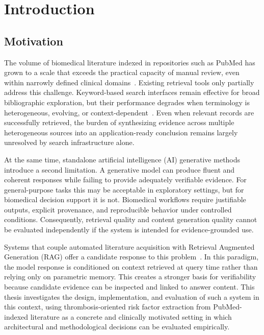 \chapter{Introduction}

\section{Motivation}

The volume of biomedical literature indexed in repositories such as PubMed has grown to a scale that exceeds the practical capacity of manual review, even within narrowly defined clinical domains~\cite{sayers2022eutilities}. Existing retrieval tools only partially address this challenge. Keyword-based search interfaces remain effective for broad bibliographic exploration, but their performance degrades when terminology is heterogeneous, evolving, or context-dependent~\cite{fiorini2018bestmatch}. Even when relevant records are successfully retrieved, the burden of synthesizing evidence across multiple heterogeneous sources into an application-ready conclusion remains largely unresolved by search infrastructure alone.

At the same time, standalone artificial intelligence (AI) generative methods introduce a second limitation. A generative model can produce fluent and coherent responses while failing to provide adequately verifiable evidence. For general-purpose tasks this may be acceptable in exploratory settings, but for biomedical decision support it is not. Biomedical workflows require justifiable outputs, explicit provenance, and reproducible behavior under controlled conditions. Consequently, retrieval quality and content generation quality cannot be evaluated independently if the system is intended for evidence-grounded use.

Systems that couple automated literature acquisition with Retrieval Augmented Generation (RAG) offer a candidate response to this problem~\cite{lewis2020rag}. In this paradigm, the model response is conditioned on context retrieved at query time rather than relying only on parametric memory. This creates a stronger basis for verifiability because candidate evidence can be inspected and linked to answer content. This thesis investigates the design, implementation, and evaluation of such a system in this context, using thrombosis-oriented risk factor extraction from PubMed-indexed literature as a concrete and clinically motivated setting in which architectural and methodological decisions can be evaluated empirically.


